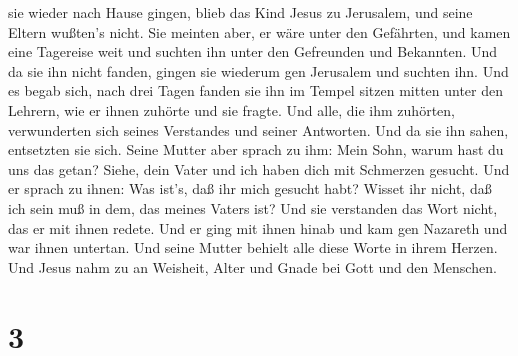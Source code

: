 sie wieder nach Hause gingen, blieb das Kind Jesus zu Jerusalem, und
seine Eltern wußten's nicht.  Sie meinten aber, er wäre
unter den Gefährten, und kamen eine Tagereise weit und suchten ihn unter
den Gefreunden und Bekannten.  Und da sie ihn nicht fanden,
gingen sie wiederum gen Jerusalem und suchten ihn.  Und es
begab sich, nach drei Tagen fanden sie ihn im Tempel sitzen mitten unter
den Lehrern, wie er ihnen zuhörte und sie fragte.  Und
alle, die ihm zuhörten, verwunderten sich seines Verstandes und seiner
Antworten.  Und da sie ihn sahen, entsetzten sie sich.
Seine Mutter aber sprach zu ihm: Mein Sohn, warum hast du uns das getan?
Siehe, dein Vater und ich haben dich mit Schmerzen gesucht.
 Und er sprach zu ihnen: Was ist's, daß ihr mich gesucht
habt? Wisset ihr nicht, daß ich sein muß in dem, das meines Vaters ist?
 Und sie verstanden das Wort nicht, das er mit ihnen
redete.  Und er ging mit ihnen hinab und kam gen Nazareth
und war ihnen untertan. Und seine Mutter behielt alle diese Worte in
ihrem Herzen.  Und Jesus nahm zu an Weisheit, Alter und
Gnade bei Gott und den Menschen.

\hypertarget{section-2}{%
\section{3}\label{section-2}}

